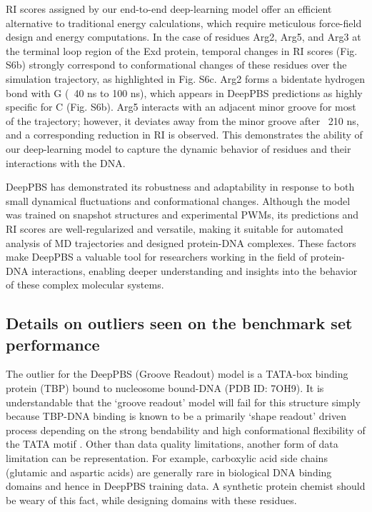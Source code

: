 RI scores assigned by our end-to-end deep-learning model offer an efficient alternative to traditional energy calculations, which require meticulous force-field design and energy computations. In the case of residues Arg2, Arg5, and Arg3 at the terminal loop region of the Exd protein, temporal changes in RI scores (Fig. S6b) strongly correspond to conformational changes of these residues over the simulation trajectory, as highlighted in Fig. S6c. Arg2 forms a bidentate hydrogen bond with G (~40 ns to 100 ns), which appears in DeepPBS predictions as highly specific for C (Fig. S6b). Arg5 interacts with an adjacent minor groove for most of the trajectory; however, it deviates away from the minor groove after ~210 ns, and a corresponding reduction in RI is observed. This demonstrates the ability of our deep-learning model to capture the dynamic behavior of residues and their interactions with the DNA.

DeepPBS has demonstrated its robustness and adaptability in response to both small dynamical fluctuations and conformational changes. Although the model was trained on snapshot structures and experimental PWMs, its predictions and RI scores are well-regularized and versatile, making it suitable for automated analysis of MD trajectories and designed protein-DNA complexes. These factors make DeepPBS a valuable tool for researchers working in the field of protein-DNA interactions, enabling deeper understanding and insights into the behavior of these complex molecular systems.

\subsection{Details on outliers seen on the benchmark set performance}

The outlier for the DeepPBS (Groove Readout) model is a TATA-box binding protein (TBP) bound to nucleosome bound-DNA (PDB ID: 7OH9). It is understandable that the ‘groove readout’ model will fail for this structure simply because TBP-DNA binding is known to be a primarily ‘shape readout’ driven process depending on the strong bendability and high conformational flexibility of the TATA motif \citep{simon2006}. Other than data quality limitations, another form of data limitation can be representation. For example, carboxylic acid side chains (glutamic and aspartic acids) are generally rare in biological DNA binding domains and hence in DeepPBS training data. A synthetic protein chemist should be weary of this fact, while designing domains with these residues. 

